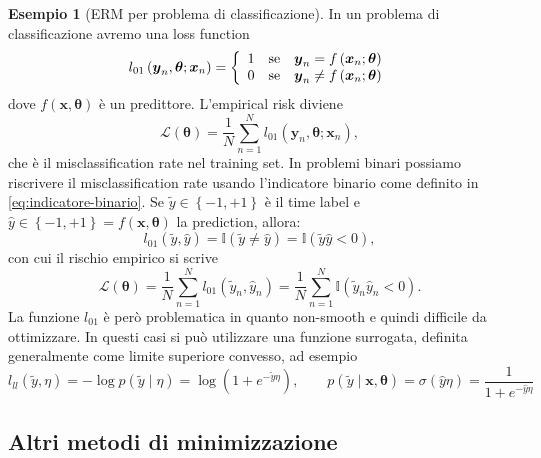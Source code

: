 \documentclass[10pt]{article}
\renewcommand{\vec}[1]{\boldsymbol{#1}}
\newcommand{\cond}{\mid}
\newcommand{\pare}[1]{
	\ensuremath{\left(#1\right)}
}
\theoremstyle{definition}
\newtheorem{example}{Esempio}[section]
\begin{document}
\begin{example}[ERM per problema di classificazione]
In un problema di classificazione avremo una loss function
\begin{equation}
l_{01}\pare{\vec{y}_n, \vec{\theta}; \vec{x}_n} = \left\{\begin{array}{l@{\quad\text{se}\quad}l}
1 & \vec{y}_n = f\pare{\vec{x}_n; \vec{\theta}} \\
0 & \vec{y}_n \neq f\pare{\vec{x}_n; \vec{\theta}} 
\end{array}\right.
\end{equation}
dove $f\pare{\vec{x}, \vec{\theta}}$ è un predittore. L'empirical risk diviene
\begin{equation}
\mathcal{L}\pare{\vec{\theta}} = \frac{1}{N}\sum_{n=1}^N l_{01}\pare{\vec{y}_n, \vec{\theta}; \vec{x}_n},
\end{equation}
che è il misclassification rate nel training set. In problemi binari possiamo riscrivere il misclassification rate usando l'indicatore binario come definito in \eqref{eq:indicatore-binario}. Se $\tilde{y} \in \left\{ -1, +1 \right\}$ è il time label e $\hat{y}\in \left\{-1, +1\right\} = f\pare{\vec{x}, \vec{\theta}}$ la prediction, allora:
\begin{equation}
l_{01}\pare{\tilde{y}, \hat{y}} = \mathbb{I}\pare{\tilde{y}\neq\hat{y}} = \mathbb{I}\pare{\tilde{y}\hat{y}<0},
\end{equation}
con cui il rischio empirico si scrive
\begin{equation}
\mathcal{L}\pare{\vec{\theta}} = \frac{1}{N}\sum_{n=1}^{N}l_{01}\pare{\tilde{y}_n, \hat{y}_n} = \frac{1}{N}\sum_{n=1}^N\mathbb{I}\pare{\tilde{y}_n\hat{y}_n < 0}.
\end{equation}
La funzione $l_{01}$ è però problematica in quanto non-smooth e quindi difficile da ottimizzare. In questi casi si può utilizzare una funzione surrogata, definita generalmente come limite superiore convesso, ad esempio
\begin{equation}
l_{ll}\pare{\tilde{y}, \eta} = -\log{p\pare{\tilde{y}\cond\eta}} = \log\pare{1 + e^{-\tilde{y}\eta}},\qquad p\pare{\tilde{y}\cond\vec{x},\vec{\theta}} = \sigma\pare{\hat{y}\eta} = \frac{1}{1+e^{-\hat{y}\eta}}
\end{equation}
\end{example}

\subsection{Altri metodi di minimizzazione}
\end{document}
